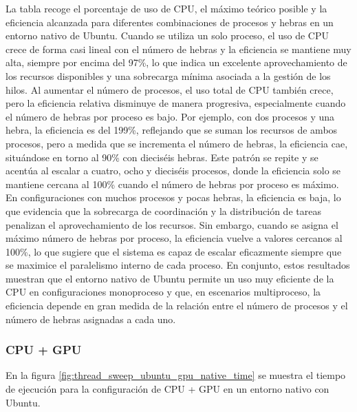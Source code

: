 La tabla recoge el porcentaje de uso de CPU, el máximo teórico posible y la eficiencia alcanzada para diferentes combinaciones de procesos y hebras en un entorno nativo de Ubuntu. Cuando se utiliza un solo proceso, el uso de CPU crece de forma casi lineal con el número de hebras y la eficiencia se mantiene muy alta, siempre por encima del 97\%, lo que indica un excelente aprovechamiento de los recursos disponibles y una sobrecarga mínima asociada a la gestión de los hilos. Al aumentar el número de procesos, el uso total de CPU también crece, pero la eficiencia relativa disminuye de manera progresiva, especialmente cuando el número de hebras por proceso es bajo. Por ejemplo, con dos procesos y una hebra, la eficiencia es del 199\%, reflejando que se suman los recursos de ambos procesos, pero a medida que se incrementa el número de hebras, la eficiencia cae, situándose en torno al 90\% con dieciséis hebras. Este patrón se repite y se acentúa al escalar a cuatro, ocho y dieciséis procesos, donde la eficiencia solo se mantiene cercana al 100\% cuando el número de hebras por proceso es máximo. En configuraciones con muchos procesos y pocas hebras, la eficiencia es baja, lo que evidencia que la sobrecarga de coordinación y la distribución de tareas penalizan el aprovechamiento de los recursos. Sin embargo, cuando se asigna el máximo número de hebras por proceso, la eficiencia vuelve a valores cercanos al 100\%, lo que sugiere que el sistema es capaz de escalar eficazmente siempre que se maximice el paralelismo interno de cada proceso. En conjunto, estos resultados muestran que el entorno nativo de Ubuntu permite un uso muy eficiente de la CPU en configuraciones monoproceso y que, en escenarios multiproceso, la eficiencia depende en gran medida de la relación entre el número de procesos y el número de hebras asignadas a cada uno.

\subsubsection{CPU + GPU}

En la figura \ref{fig:thread_sweep_ubuntu_gpu_native_time} se muestra el tiempo de ejecución para la configuración de CPU + GPU en un entorno nativo con Ubuntu.

